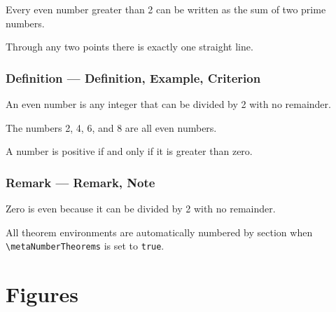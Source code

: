 		\begin{conjecture}
			\label{con:goldbach}
			Every even number greater than 2 can be written as the sum of two prime numbers.
		\end{conjecture}
		
		\begin{axiom}
			\label{axm:line}
			Through any two points there is exactly one straight line.
		\end{axiom}
		
		\subsubsection{Definition --- Definition, Example, Criterion}
		
		\begin{definition}
			\label{def:even}
			An even number is any integer that can be divided by 2 with no remainder.
		\end{definition}
		
		\begin{example}
			\label{ex:even}
			The numbers 2, 4, 6, and 8 are all even numbers.
		\end{example}
		
		\begin{criterion}
			\label{crit:positive}
			A number is positive if and only if it is greater than zero.
		\end{criterion}
		
		\subsubsection{Remark --- Remark, Note}
		
		\begin{remark}
			\label{rem:zero}
			Zero is even because it can be divided by 2 with no remainder.
		\end{remark}
		
		\begin{note}
			\label{note:numbering}
			All theorem environments are automatically numbered by section when \texttt{\textbackslash metaNumberTheorems} is set to \texttt{true}.
		\end{note}

\section{Figures}

